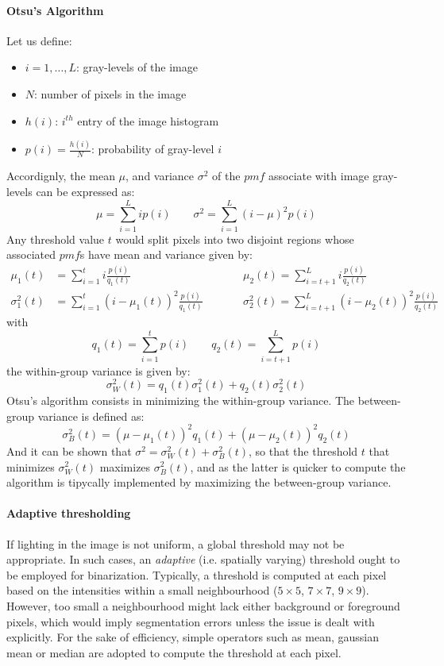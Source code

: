 \documentclass{article}
\begin{document}
\paragraph{Otsu's Algorithm}
Let us define:
\begin{itemize}
    \item $i=1,\dots,L$: gray-levels of the image 
    \item $N$: number of pixels in the image 
    \item $h(i)$: $i^{th}$ entry of the image histogram 
    \item $p(i)=\frac{h(i)}{N}$: probability of gray-level $i$
\end{itemize}
Accordignly, the mean $\mu$, and variance $\sigma^2$ of the $pmf$ associate with image gray-levels can be expressed as:
\[
    \mu = \sum_{i=1}^{L} i p(i) \qquad \sigma^2 = \sum_{i=1}^{L} (i-\mu)^2 p(i)
\]
Any threshold value $t$ would split pixels into two disjoint regions whose associated $pmf$s have mean and variance given by:
\begin{align*}
    \mu_1(t) &= \sum_{i=1}^{t} i \frac{p(i)}{q_1(t)} \qquad &&\mu_2(t) = \sum_{i=t+1}^{L} i \frac{p(i)}{q_2(t)}\\
    \sigma_1^2(t) &= \sum_{i=1}^{t} (i-\mu_1(t))^2 \frac{p(i)}{q_1(t)} \qquad &&\sigma_2^2(t) = \sum_{i=t+1}^{L} (i-\mu_2(t))^2 \frac{p(i)}{q_2(t)}
\end{align*}
with
\[
    q_1(t) = \displaystyle\sum_{i=1}^{t} p(i) \qquad q_2(t) = \displaystyle\sum_{i=t+1}^{L} p(i)
\]
the within-group variance is given by:
\[
    \sigma_W^2(t) = q_1(t)\sigma_1^2(t) + q_2(t)\sigma_2^2(t)
\]
Otsu's algorithm consists in minimizing the within-group variance. The between-group variance is defined as:
\[
    \sigma_B^2(t) = (\mu-\mu_1(t))^2q_1(t) + (\mu-\mu_2(t))^2q_2(t)
\]
And it can be shown that $\sigma^2 = \sigma_W^2(t) + \sigma_B^2(t)$, so that the threshold $t$ that minimizes $\sigma_W^2(t)$ maximizes $\sigma_B^2(t)$, and as the latter is quicker to compute the algorithm is tipycally implemented by maximizing the between-group variance.
\paragraph{Adaptive thresholding}
If lighting in the image is not uniform, a global threshold may not be appropriate. In such cases, an \emph{adaptive} (i.e. spatially varying) threshold ought to be employed for binarization. Typically, a threshold is computed at each pixel based on the intensities within a small neighbourhood ($5\times 5$, $7\times 7$, $9\times 9$). However, too small a neighbourhood might lack either background or foreground pixels, which would imply segmentation errors unless the issue is dealt with explicitly. For the sake of efficiency, simple operators such as mean, gaussian mean or median are adopted to compute the threshold at each pixel.
\end{document}
